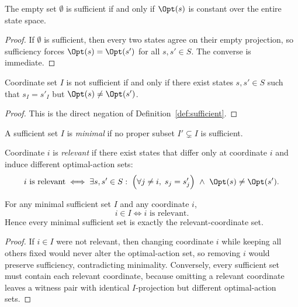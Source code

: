 \begin{proposition}\label{prop:empty-sufficient-constant}
The empty set $\emptyset$ is sufficient if and only if $\Opt(s)$ is constant over the entire state space.
\end{proposition}

\begin{proof}
If $\emptyset$ is sufficient, then every two states agree on their empty projection, so sufficiency forces $\Opt(s)=\Opt(s')$ for all $s,s' \in S$. The converse is immediate.
\end{proof}

\begin{proposition}\label{prop:insufficiency-counterexample}
Coordinate set $I$ is not sufficient if and only if there exist states $s,s' \in S$ such that $s_I=s'_I$ but $\Opt(s)\neq\Opt(s')$.
\end{proposition}

\begin{proof}
This is the direct negation of Definition~\ref{def:sufficient}.
\end{proof}

\begin{definition}\label{def:minimal-sufficient}
A sufficient set $I$ is \emph{minimal} if no proper subset $I' \subsetneq I$ is sufficient.
\end{definition}

\begin{definition}\label{def:relevant}
Coordinate $i$ is \emph{relevant} if there exist states that differ only at coordinate $i$ and induce different optimal-action sets:
\[
i \text{ is relevant}
\iff
\exists s,s' \in S:\;
\Big(\forall j \neq i,\; s_j=s'_j\Big)
\ \wedge\
\Opt(s)\neq\Opt(s').
\]
\end{definition}

\begin{proposition}\label{prop:minimal-relevant-equiv}
For any minimal sufficient set $I$ and any coordinate $i$,
\[
i \in I \iff i \text{ is relevant}.
\]
Hence every minimal sufficient set is exactly the relevant-coordinate set.
\end{proposition}

\begin{proof}
If $i \in I$ were not relevant, then changing coordinate $i$ while keeping all others fixed would never alter the optimal-action set, so removing $i$ would preserve sufficiency, contradicting minimality. Conversely, every sufficient set must contain each relevant coordinate, because omitting a relevant coordinate leaves a witness pair with identical $I$-projection but different optimal-action sets.
\end{proof}

